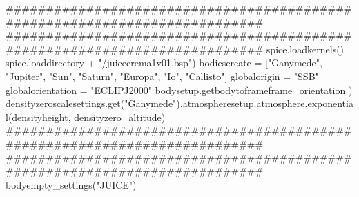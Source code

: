 {}###########################################################################\markdownRendererInterblockSeparator
{}
\markdownRendererSectionEnd \markdownRendererSectionBegin
{}\markdownRendererInterblockSeparator
{}###########################################################################\markdownRendererInterblockSeparator
{}
\markdownRendererSectionEnd \markdownRendererSectionBegin
{}\markdownRendererInterblockSeparator
{}spice.loadkernels() spice.loaddirectory + "/juicecrema1v01.bsp")\markdownRendererInterblockSeparator
{}
\markdownRendererSectionEnd \markdownRendererSectionBegin
{}\markdownRendererInterblockSeparator
{}bodiescreate = ["Ganymede", "Jupiter", "Sun", "Saturn", "Europa", "Io", "Callisto"] globalorigin = "SSB" globalorientation = "ECLIPJ2000" bodysetup.getbodytoframeframe_orientation )\markdownRendererInterblockSeparator
{}
\markdownRendererSectionEnd \markdownRendererSectionBegin
{}\markdownRendererInterblockSeparator
{}densityzeroscalesettings.get("Ganymede").atmospheresetup.atmosphere.exponential(densityheight, densityzero_altitude)\markdownRendererInterblockSeparator
{}###########################################################################\markdownRendererInterblockSeparator
{}
\markdownRendererSectionEnd \markdownRendererSectionBegin
{}\markdownRendererInterblockSeparator
{}########################################################################### bodyempty_settings("JUICE")\markdownRendererInterblockSeparator
{}
\markdownRendererSectionEnd \markdownRendererSectionBegin
{}\markdownRendererInterblockSeparator
